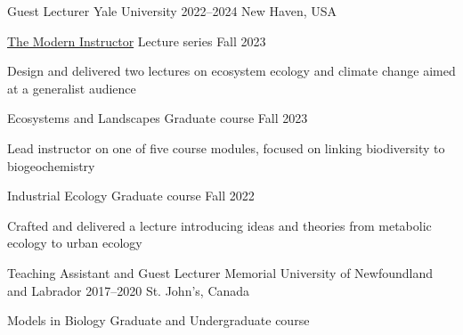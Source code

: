 

\begin{cventries}

  \cventry
    {Guest Lecturer} %
    {Yale University} %
    {2022--2024} %
    {New Haven, USA} %
    {
      \begin{cvsubentries}
       \cvsubentry
        {\href{https://ypa.yale.edu/skills-and-career-development/modern-instructor}{The Modern Instructor}}
        {\footnotesize Lecture series}
        {Fall 2023}
        {
         \begin{cvitems}
          \item Design and delivered two lectures on ecosystem ecology and climate change aimed at a generalist audience
         \end{cvitems} 
        }
       \cvsubentry
        {Ecosystems and Landscapes}
        {\footnotesize Graduate course}
        {Fall 2023}
        {
         \begin{cvitems}
          \item Lead instructor on one of five course modules, focused on linking biodiversity to biogeochemistry
         \end{cvitems} 
        }
       \cvsubentry
         {Industrial Ecology}
         {\footnotesize Graduate course}
         {Fall 2022}
         {
         \begin{cvitems}
          \item Crafted and delivered a lecture introducing ideas and theories from metabolic ecology to urban ecology
         \end{cvitems} 
         }
      \end{cvsubentries}
    }
  \cventry
    {Teaching Assistant and Guest Lecturer} %
    {Memorial University of Newfoundland and Labrador} %
    {2017--2020} %
    {St. John's, Canada} %
    {
      \begin{cvsubentries}
       \cvsubentry
         {Models in Biology}
         {\footnotesize Graduate and Undergraduate course}

\end{cvsubentries}}
\end{cventries}
